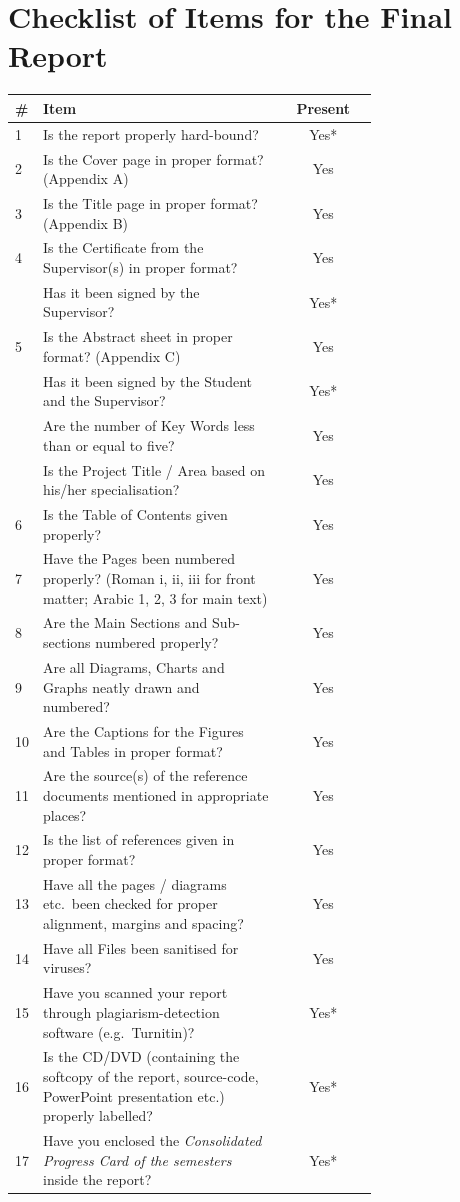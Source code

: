 \chapter*{Checklist of Items for the Final Report}

\begin{longtable}{@{}p{0.06\linewidth}p{0.66\linewidth}c@{}}
\bfseries \# & \bfseries Item & \bfseries Present\\
\midrule
\endhead
 1 & Is the report properly hard-bound?               & Yes*\\
 2 & Is the Cover page in proper format? (Appendix A) & Yes\\
 3 & Is the Title page in proper format? (Appendix B) & Yes\\
 4 & Is the Certificate from the Supervisor(s) in proper format?          & Yes\\
   & Has it been signed by the Supervisor?                                & Yes*\\
 5 & Is the Abstract sheet in proper format? (Appendix C)                 & Yes\\
   & Has it been signed by the Student and the Supervisor?                & Yes*\\
   & Are the number of Key Words less than or equal to five?              & Yes\\
   & Is the Project Title / Area based on his/her specialisation?         & Yes\\
 6 & Is the Table of Contents given properly?                             & Yes\\
 7 & Have the Pages been numbered properly? (Roman i, ii, iii for front matter; Arabic 1, 2, 3 for main text) & Yes\\
 8 & Are the Main Sections and Sub-sections numbered properly?            & Yes\\
 9 & Are all Diagrams, Charts and Graphs neatly drawn and numbered?       & Yes\\
10 & Are the Captions for the Figures and Tables in proper format?        & Yes\\
11 & Are the source(s) of the reference documents mentioned in appropriate places? & Yes\\
12 & Is the list of references given in proper format?                    & Yes\\
13 & Have all the pages / diagrams etc.\ been checked for proper alignment, margins and spacing? & Yes\\
14 & Have all Files been sanitised for viruses?                           & Yes\\
15 & Have you scanned your report through plagiarism-detection software (e.g.\ Turnitin)? & Yes*\\
16 & Is the CD/DVD (containing the softcopy of the report, source-code, PowerPoint presentation etc.) properly labelled? & Yes*\\
17 & Have you enclosed the \textit{Consolidated Progress Card of the semesters} inside the report? & Yes*\\
\end{longtable}

